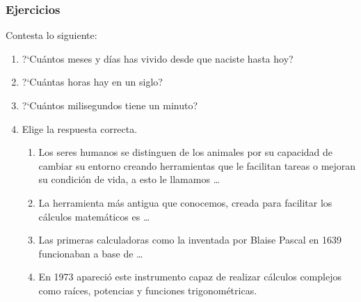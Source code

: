 \documentclass[11pt]{book}
\begin{document}
\newpage
\subsubsection{Ejercicios}
Contesta lo siguiente:

\begin{enumerate}
  \item ?`Cu\'antos meses y d\'ias has vivido desde que naciste hasta hoy?
  \item ?`Cu\'antas horas hay en un siglo?
  \item ?`Cu\'antos milisegundos tiene un minuto?

  \item Elige la respuesta correcta.
        \begin{enumerate}
          \item Los seres humanos se distinguen de los animales por su capacidad de
                cambiar su entorno creando herramientas que le facilitan tareas o mejoran su
                condici\'on de vida, a esto le llamamos \dots

          \item La herramienta m\'as antigua que conocemos, creada para facilitar los
                c\'alculos matem\'aticos es \dots

          \item Las primeras calculadoras como la inventada por Blaise Pascal en 1639
                funcionaban a base de \dots

          \item  En 1973 apareci\'o este instrumento capaz de realizar c\'alculos
                complejos como ra\'ices, potencias y  funciones trigonom\'etricas.


\end{enumerate}
\end{enumerate}
\end{document}
